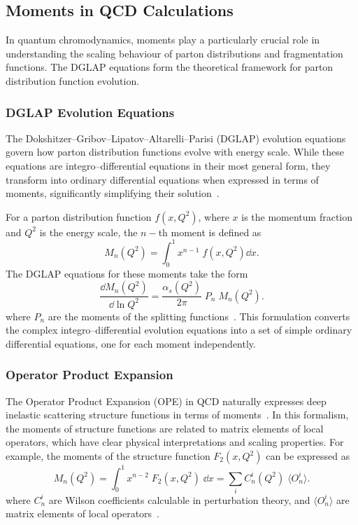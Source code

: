     \subsection{Moments in QCD Calculations}
        In quantum chromodynamics, moments play a particularly crucial role in understanding the scaling behaviour of parton distributions and fragmentation functions.
        The DGLAP equations form the theoretical framework for parton distribution function evolution. 
        \subsubsection{DGLAP Evolution Equations}
            The Dokshitzer--Gribov--Lipatov--Altarelli--Parisi (DGLAP) evolution equations~\cite{thomson_modern_2013, Altarelli:1977zs, dokshitzerCalculationStructureFunctions1977, gribovDeepInelasticEp1972} govern how parton distribution functions evolve with energy scale.
            While these equations are integro--differential equations in their most general form, they transform into ordinary differential equations when expressed in terms of moments, significantly simplifying their solution~\cite{Kotlorz:2014fia, Kotlorz:2006dj, Skands:2012ts, dissertori_quantum_2003, Altarelli:1981ax, alma9914845810606531, Gross:1973id, Gross:1973ju, Politzer:1973fx, Moch:2004pa, Vogt:2018ytw}.

            For a parton distribution function $f(x,Q^2)$, where $x$ is the momentum fraction and $Q^2$ is the energy scale, the $n-$th moment is defined as
            \[
                M_n(Q^2) = \int_0^1 x^{n-1}\;f(x,Q^2) \dd x.
            \]
            The DGLAP equations for these moments take the form
            \[
            \frac{\dd M_n(Q^2)}{\dd \ln Q^2} = \frac{\alpha_s(Q^2)}{2\pi}\; P_n\;M_n(Q^2).
            \]
            where $P_n$ are the moments of the splitting functions~\cite{Ellis:1996mzs, salam_elements_2011, Schoeffel:1998tz, Strozik-Kotlorz:2014xga, Simonelli:2024vyh}.
            This formulation converts the complex integro--differential evolution equations into a set of simple ordinary differential equations, one for each moment independently.

        \subsubsection{Operator Product Expansion}
            The Operator Product Expansion (OPE) in QCD naturally expresses deep inelastic scattering structure functions in terms of moments~\cite{Gockeler:2006nq}.
            In this formalism, the moments of structure functions are related to matrix elements of local operators, which have clear physical interpretations and scaling properties.
            For example, the moments of the structure function $F_2(x,Q^2)$ can be expressed as
            \[
                M_n(Q^2) = \int_0^1 x^{n-2}\;F_2(x,Q^2)\;\dd x = \sum_i C_n^i(Q^2) \;\langle O_n^i \rangle.
            \]
            where $C_n^i$ are Wilson coefficients calculable in perturbation theory, and $\langle O_n^i \rangle$ are matrix elements of local operators~\cite{Bardeen:1978yd}.
